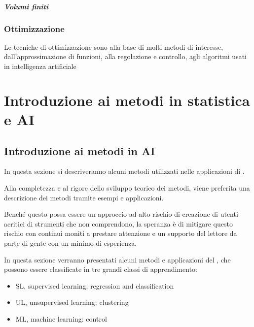 \documentclass[letterpaper,10pt,english]{jupyterBook}
\begin{document}
\subsubsection{Volumi finiti}
\label{\detokenize{ch/numerics/ode-boundary:volumi-finiti}}
\sphinxstepscope


\section{Ottimizzazione}
\label{\detokenize{ch/numerics/optimization:ottimizzazione}}\label{\detokenize{ch/numerics/optimization::doc}}
\sphinxAtStartPar
Le tecniche di ottimizzazione sono alla base di molti metodi di interesse, dall’approssimazione di funzioni, alla regolazione e controllo, agli algoritmi usati in intelligenza artificiale

\sphinxstepscope


\part{Introduzione ai metodi in statistica e  AI}

\sphinxstepscope


\chapter{Introduzione ai metodi in AI}
\label{\detokenize{ch/ai:introduzione-ai-metodi-in-ai}}\label{\detokenize{ch/ai:book-ai-hs}}\label{\detokenize{ch/ai::doc}}
\sphinxAtStartPar
In questa sezione si descriveranno alcuni metodi utilizzati nelle applicazioni di .

\sphinxAtStartPar
{} Alla completezza e al rigore dello sviluppo teorico dei metodi, viene preferita una descrizione dei metodi tramite esempi e applicazioni.

\sphinxAtStartPar
Benché questo possa essere un approccio ad alto rischio di creazione di utenti acritici di strumenti che non comprendono, la speranza è di mitigare questo rischio con continui moniti a prestare attenzione e un supporto del lettore da parte di gente con un minimo di esperienza.

\sphinxAtStartPar
{} In questa sezione verranno presentati alcuni metodi e applicazioni del , che possono essere classificate in tre grandi classi di apprendimento:
\begin{itemize}
\item {} 
\sphinxAtStartPar
SL, supervised learning: regression and classification

\item {} 
\sphinxAtStartPar
UL, unsupervised learning: clustering

\item {} 
\sphinxAtStartPar
ML, machine learning: control

\end{itemize}
\end{document}
